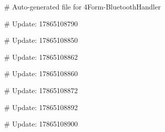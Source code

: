 # Auto-generated file for 4Form-BluetoothHandler

# Update: 17865108790

# Update: 17865108850

# Update: 17865108862

# Update: 17865108860

# Update: 17865108872

# Update: 17865108892

# Update: 17865108900
